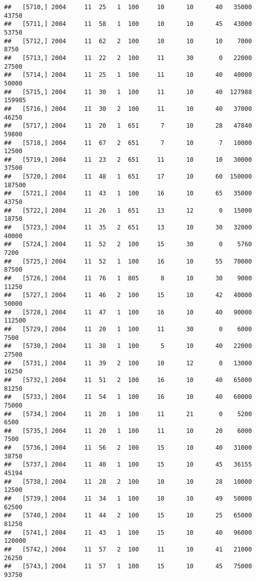 \documentclass{article}\usepackage[]{graphicx}\usepackage[]{color}
\makeatletter
\newenvironment{kframe}{%
 \def\at@end@of@kframe{}%
 \ifinner\ifhmode%
  \def\at@end@of@kframe{\end{minipage}}%
  \begin{minipage}{\columnwidth}%
 \fi\fi%
 \def\FrameCommand##1{\hskip\@totalleftmargin \hskip-\fboxsep
 \colorbox{shadecolor}{##1}\hskip-\fboxsep
     \hskip-\linewidth \hskip-\@totalleftmargin \hskip\columnwidth}%
 \MakeFramed {\advance\hsize-\width
   \@totalleftmargin\z@ \linewidth\hsize
   \@setminipage}}%
 {\par\unskip\endMakeFramed%
 \at@end@of@kframe}
\newenvironment{knitrout}{}{} %
\makeatother
\begin{document}
\begin{knitrout}
\begin{kframe}
\begin{verbatim}
##   [5710,] 2004     11  25   1  100     10      10      40   35000   43750
##   [5711,] 2004     11  58   1  100     10      10      45   43000   53750
##   [5712,] 2004     11  62   2  100     10      10      10    7000    8750
##   [5713,] 2004     11  22   2  100     11      30       0   22000   27500
##   [5714,] 2004     11  25   1  100     11      10      40   40000   50000
##   [5715,] 2004     11  30   1  100     11      10      40  127988  159985
##   [5716,] 2004     11  30   2  100     11      10      40   37000   46250
##   [5717,] 2004     11  20   1  651      7      10      28   47840   59800
##   [5718,] 2004     11  67   2  651      7      10       7   10000   12500
##   [5719,] 2004     11  23   2  651     11      10      10   30000   37500
##   [5720,] 2004     11  48   1  651     17      10      60  150000  187500
##   [5721,] 2004     11  43   1  100     16      10      65   35000   43750
##   [5722,] 2004     11  26   1  651     13      12       0   15000   18750
##   [5723,] 2004     11  35   2  651     13      10      30   32000   40000
##   [5724,] 2004     11  52   2  100     15      30       0    5760    7200
##   [5725,] 2004     11  52   1  100     16      10      55   70000   87500
##   [5726,] 2004     11  76   1  805      8      10      30    9000   11250
##   [5727,] 2004     11  46   2  100     15      10      42   40000   50000
##   [5728,] 2004     11  47   1  100     16      10      40   90000  112500
##   [5729,] 2004     11  20   1  100     11      30       0    6000    7500
##   [5730,] 2004     11  38   1  100      5      10      40   22000   27500
##   [5731,] 2004     11  39   2  100     10      12       0   13000   16250
##   [5732,] 2004     11  51   2  100     16      10      40   65000   81250
##   [5733,] 2004     11  54   1  100     16      10      40   60000   75000
##   [5734,] 2004     11  20   1  100     11      21       0    5200    6500
##   [5735,] 2004     11  20   1  100     11      10      20    6000    7500
##   [5736,] 2004     11  56   2  100     15      10      40   31000   38750
##   [5737,] 2004     11  40   1  100     15      10      45   36155   45194
##   [5738,] 2004     11  28   2  100     10      10      28   10000   12500
##   [5739,] 2004     11  34   1  100     10      10      49   50000   62500
##   [5740,] 2004     11  44   2  100     15      10      25   65000   81250
##   [5741,] 2004     11  43   1  100     15      10      40   96000  120000
##   [5742,] 2004     11  57   2  100     11      10      41   21000   26250
##   [5743,] 2004     11  57   1  100     15      10      45   75000   93750

\end{verbatim}
\end{kframe}
\end{knitrout}
\end{document}
